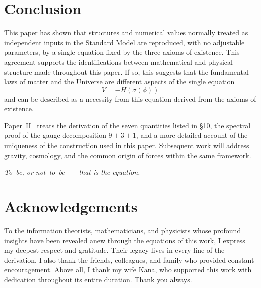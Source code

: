 \documentclass[12pt,a4paper]{article}
\begin{document}
\section{Conclusion}\label{sec:conclusion}

This paper has shown that structures and numerical values normally
treated as independent inputs in the Standard Model are reproduced,
with no adjustable parameters, by a single equation fixed by the
three axioms of existence. This agreement supports the
identifications between mathematical and physical structure made
throughout this paper. If so, this suggests that the
fundamental laws of matter and the Universe are different aspects of
the single equation
\[
  V = -H(\sigma(\phi))
\]
and can be described as a necessity from this equation derived from
the axioms of existence.

Paper~II~\cite{paper2} treats the derivation of the seven quantities listed in \S10,
 the spectral proof of the gauge decomposition $9{+}3{+}1$,
and a more detailed account of the uniqueness of the construction used
in this paper.
Subsequent work will address gravity, cosmology, and the common origin of forces within the same framework.

\medskip
\noindent
\textit{To~be, or not~to~be~---~that is the equation.}

\section*{Acknowledgements}
To the information theorists, mathematicians, and physicists
whose profound insights have been revealed anew through the
equations of this work, I express my deepest respect and gratitude.
Their legacy lives in every line of the derivation.
I also thank the friends, colleagues, and family who provided
constant encouragement.
Above all, I thank my wife Kana, who supported this work with
dedication throughout its entire duration. Thank you always.

\small
\end{document}
